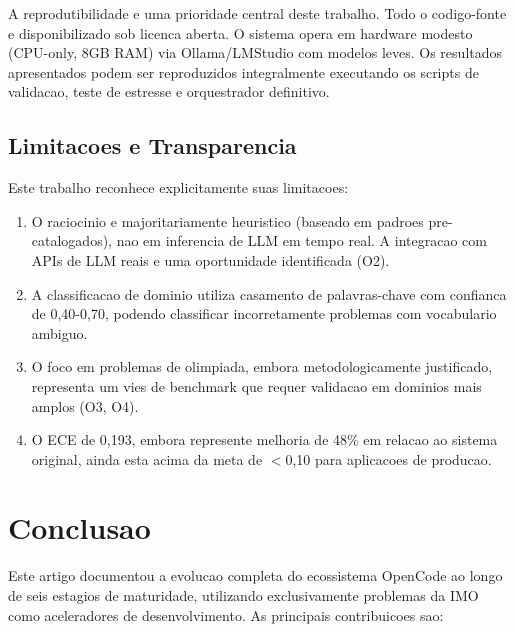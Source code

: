 \documentclass[5p]{elsarticle}
\begin{document}
A reprodutibilidade e uma prioridade central deste trabalho. Todo o codigo-fonte
e disponibilizado sob licenca aberta. O sistema opera em hardware modesto
(CPU-only, 8GB RAM) via Ollama/LMStudio com modelos leves. Os resultados
apresentados podem ser reproduzidos integralmente executando os scripts de
validacao, teste de estresse e orquestrador definitivo.

\subsection{Limitacoes e Transparencia}

Este trabalho reconhece explicitamente suas limitacoes:

\begin{enumerate}[label=(\arabic*)]
  \item O raciocinio e majoritariamente heuristico (baseado em padroes
    pre-catalogados), nao em inferencia de LLM em tempo real. A integracao
    com APIs de LLM reais e uma oportunidade identificada (O2).
  \item A classificacao de dominio utiliza casamento de palavras-chave com
    confianca de 0,40-0,70, podendo classificar incorretamente problemas com
    vocabulario ambiguo.
  \item O foco em problemas de olimpiada, embora metodologicamente justificado,
    representa um vies de benchmark que requer validacao em dominios mais
    amplos (O3, O4).
  \item O ECE de 0,193, embora represente melhoria de 48\% em relacao ao sistema
    original, ainda esta acima da meta de $<$0,10 para aplicacoes de producao.
\end{enumerate}

\section{Conclusao}

Este artigo documentou a evolucao completa do ecossistema OpenCode ao longo de
seis estagios de maturidade, utilizando exclusivamente problemas da IMO como
aceleradores de desenvolvimento. As principais contribuicoes sao:
\end{document}
